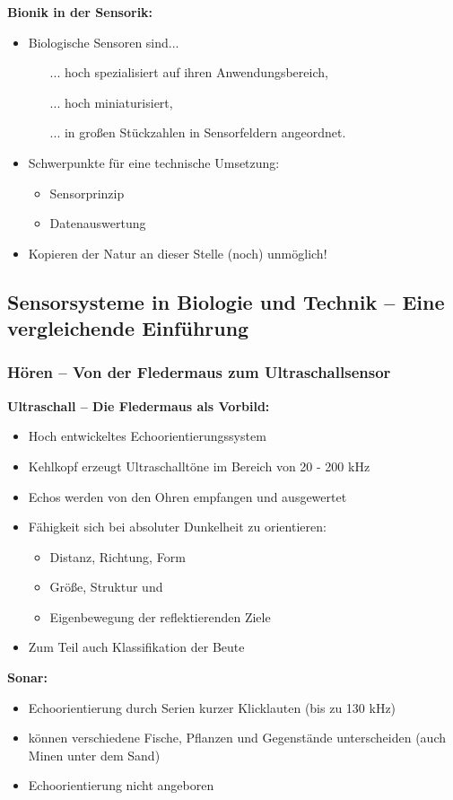 \textbf{Bionik in der Sensorik:}
\begin{itemize}
\setlength\itemsep{0em}
\item Biologische Sensoren sind...
\begin{itemize}
\setlength\itemsep{0em}
\item[...] hoch spezialisiert auf ihren Anwendungsbereich,
\item[...] hoch miniaturisiert,
\item[...] in großen \glqq Stückzahlen\grqq{} in Sensorfeldern angeordnet.
\end{itemize}
\item Schwerpunkte für eine technische Umsetzung:
\begin{itemize}
\setlength\itemsep{0em}
\item Sensorprinzip
\item Datenauswertung
\end{itemize}
\item Kopieren der Natur an dieser Stelle (noch) unmöglich!
\end{itemize}
\subsection{Sensorsysteme in Biologie und Technik – Eine vergleichende Einführung}
\subsubsection{Hören – Von der Fledermaus zum Ultraschallsensor}
\textbf{Ultraschall – Die Fledermaus als Vorbild:}
\begin{itemize}
\setlength\itemsep{0em}
\item Hoch entwickeltes Echoorientierungssystem
\item Kehlkopf erzeugt Ultraschalltöne im Bereich von 20 - 200 kHz
\item Echos werden von den Ohren empfangen und ausgewertet
\item Fähigkeit sich bei absoluter Dunkelheit zu orientieren:
\begin{itemize}
\setlength\itemsep{0em}
\item Distanz, Richtung, Form
\item Größe, Struktur und
\item Eigenbewegung der reflektierenden Ziele
\end{itemize}
\item Zum Teil auch Klassifikation der Beute
\end{itemize}
\textbf{Sonar:}
\begin{itemize}
\setlength\itemsep{0em}
\item Echoorientierung durch Serien kurzer Klicklauten (bis zu 130 kHz)
\item können verschiedene Fische, Pflanzen und Gegenstände unterscheiden (auch Minen unter dem Sand)
\item Echoorientierung nicht angeboren
\end{itemize}

